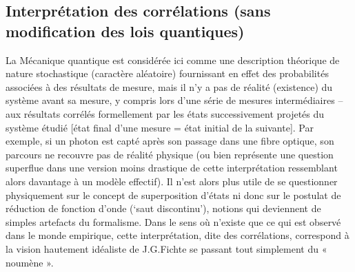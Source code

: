 \subsection{Interprétation des corrélations (sans modification des lois
 quantiques)}
 La Mécanique quantique est considérée ici comme une description théorique de nature
stochastique (caractère aléatoire) fournissant en effet des probabilités associées à des
résultats de mesure, mais il n’y a pas de réalité (existence) du système avant sa mesure, y
compris lors d’une série de mesures intermédiaires – aux résultats corrélés formellement par
les états successivement projetés du système étudié [état final d’une mesure = état initial de
la suivante]. Par exemple, si un photon est capté après son passage dans une fibre optique,
son parcours ne recouvre pas de réalité physique (ou bien représente une question superflue
dans une version moins drastique de cette interprétation ressemblant alors davantage à un
modèle effectif). Il n’est alors plus utile de se questionner physiquement sur le concept de
superposition d’états ni donc sur le postulat de réduction de fonction d’onde (‘saut
discontinu’), notions qui deviennent de simples artefacts du formalisme. Dans le sens où
n’existe que ce qui est observé dans le monde empirique, cette interprétation, dite des
corrélations, correspond à la vision hautement idéaliste de J.G.Fichte se passant tout
simplement du « noumène ».
